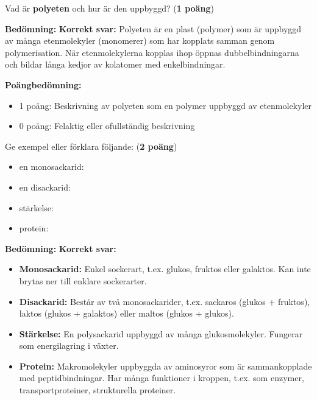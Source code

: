 \documentclass[12pt]{exam}
\newenvironment{answer}
  {\begin{framed}\color{blue}\textbf{Bedömning:} }
  {\end{framed}}
\begin{document}
\begin{questions}
\question Vad är \textbf{polyeten} och hur är den uppbyggd? (\textbf{1 poäng})
\vspace{5mm}

\begin{answer}
\textbf{Korrekt svar:} Polyeten är en plast (polymer) som är uppbyggd av många etenmolekyler (monomerer) som har kopplats samman genom polymerisation. När etenmolekylerna kopplas ihop öppnas dubbelbindningarna och bildar långa kedjor av kolatomer med enkelbindningar.

\textbf{Poängbedömning:}
\begin{itemize}
  \item 1 poäng: Beskrivning av polyeten som en polymer uppbyggd av etenmolekyler
  \item 0 poäng: Felaktig eller ofullständig beskrivning
\end{itemize}
\end{answer}
\vspace{5mm}

\question Ge exempel eller förklara följande: (\textbf{2 poäng})
\begin{itemize}
  \item en monosackarid:
  \vspace{5mm}
  \item en disackarid:
  \vspace{5mm}
  \item stärkelse:
  \vspace{5mm}
  \item protein:
\end{itemize}
\vspace{5mm}

\begin{answer}
\textbf{Korrekt svar:}
\begin{itemize}
  \item \textbf{Monosackarid:} Enkel sockerart, t.ex. glukos, fruktos eller galaktos. Kan inte brytas ner till enklare sockerarter.
  \item \textbf{Disackarid:} Består av två monosackarider, t.ex. sackaros (glukos + fruktos), laktos (glukos + galaktos) eller maltos (glukos + glukos).
  \item \textbf{Stärkelse:} En polysackarid uppbyggd av många glukosmolekyler. Fungerar som energilagring i växter.
  \item \textbf{Protein:} Makromolekyler uppbyggda av aminosyror som är sammankopplade med peptidbindningar. Har många funktioner i kroppen, t.ex. som enzymer, transportproteiner, strukturella proteiner.
\end{itemize}


\end{answer}
\end{questions}
\end{document}
